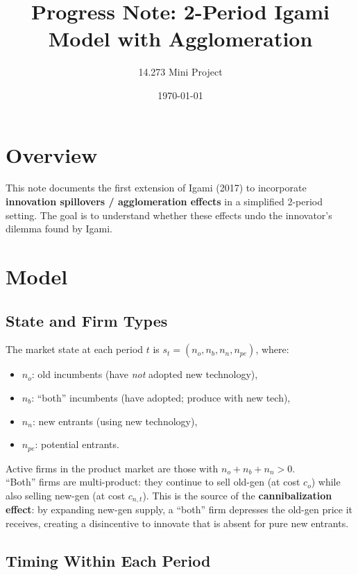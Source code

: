 \documentclass[12pt]{article}
\title{Progress Note: 2-Period Igami Model with Agglomeration}
\author{14.273 Mini Project}
\date{\today}
\begin{document}
\maketitle

\tableofcontents

\section{Overview}

This note documents the first extension of Igami (2017) to incorporate
\textbf{innovation spillovers / agglomeration effects} in a simplified 2-period
setting. The goal is to understand whether these effects undo the innovator's
dilemma found by Igami.

\section{Model}

\subsection{State and Firm Types}

The market state at each period $t$ is $s_t = (n_o, n_b, n_n, n_{pe})$, where:
\begin{itemize}
  \item $n_o$: old incumbents (have \emph{not} adopted new technology),
  \item $n_b$: ``both'' incumbents (have adopted; produce with new tech),
  \item $n_n$: new entrants (using new technology),
  \item $n_{pe}$: potential entrants.
\end{itemize}
Active firms in the product market are those with $n_o + n_b + n_n > 0$.\\

``Both'' firms are multi-product: they continue to sell old-gen (at cost
$c_o$) while also selling new-gen (at cost $c_{n,t}$). This is the source of
the \textbf{cannibalization effect}: by expanding new-gen supply, a ``both''
firm depresses the old-gen price it receives, creating a disincentive to
innovate that is absent for pure new entrants.

\subsection{Timing Within Each Period}
\end{document}
